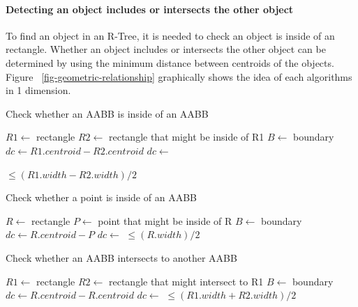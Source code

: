\documentclass[10pt,letterpaper,twocolumn]{article}
\begin{document}
\paragraph{Detecting an object includes or intersects the other object}

To find an object in an R-Tree, it is needed to check an object is inside of
an rectangle. Whether an object includes or intersects the other object can be
determined by using the minimum distance between centroids of the objects.
Figure ~\ref{fig-geometric-relationship} graphically shows the idea of each
algorithms in 1 dimension.

\begin{algorithm}
    \caption{Check whether an AABB is inside of an AABB}
    \begin{algorithmic}
        \State $R1 \gets$ rectangle
        \State $R2 \gets$ rectangle that might be inside of R1
        \State $B  \gets$ boundary
            \State $dc \gets R1.centroid - R2.centroid$
            \State $dc \gets$ 

            \State \Return {} $\leq (R1.width - R2.width) / 2$
        \EndFunction
     \end{algorithmic}
\end{algorithm}

\begin{algorithm}
    \caption{Check whether a point is inside of an AABB}
    \begin{algorithmic}
        \State $R \gets$ rectangle
        \State $P \gets$ point that might be inside of R
        \State $B \gets$ boundary
            \State $dc \gets R.centroid - P$
            \State $dc \gets$ 
            \State \Return {} $\leq (R.width) / 2$
        \EndFunction
     \end{algorithmic}
\end{algorithm}

\begin{algorithm}
    \caption{Check whether an AABB intersects to another AABB}
    \begin{algorithmic}
        \State $R1 \gets$ rectangle
        \State $R2 \gets$ rectangle that might intersect to R1
        \State $B  \gets$ boundary
            \State $dc \gets R.centroid - R.centroid$
            \State $dc \gets$ 
            \State \Return {} $\leq (R1.width + R2.width) / 2$
        \EndFunction
     \end{algorithmic}
\end{algorithm}
\end{document}
